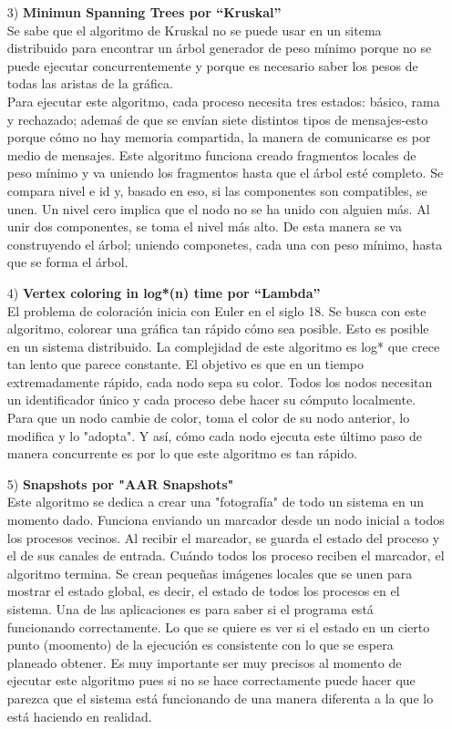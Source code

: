 \documentclass[12pt,a4paper]{report}
\begin{document}
\begin{itemize}
{    disponible. Así, dependiendo de los requerimientos del sistema, se modela un
    algoritmo que favoreca a la propiedad que sea más importante para el
    sistema.
}
\item[3)]{\textbf{Minimun Spanning Trees por “Kruskal”}\\
    Se sabe que el algoritmo de Kruskal no se puede usar en un sitema
    distribuido para encontrar un árbol generador de peso mínimo porque no se
    puede ejecutar concurrentemente y porque es necesario saber los pesos de
    todas las aristas de la gráfica. \\
    Para ejecutar este algoritmo, cada proceso necesita tres estados: básico,
    rama y rechazado; ademaś de que se envían siete distintos tipos de
    mensajes-esto porque cómo no hay memoria compartida, la manera de
    comunicarse es por medio de mensajes. Este algoritmo funciona creado
    fragmentos locales de peso mínimo y va uniendo los fragmentos hasta que el
    árbol esté completo. Se compara nivel e id y, basado en eso, si las
    componentes son compatibles, se unen. Un nivel cero implica que el nodo no
    se ha unido con alguien más. Al unir dos componentes, se toma el nivel más
    alto. De esta manera se va construyendo el árbol; uniendo componetes, cada
    una con peso mínimo, hasta que se forma el árbol.
}
\item[4)]{\textbf{Vertex coloring in log*(n) time por “Lambda”}\\
    El problema de coloración inicia con Euler en el siglo 18. Se busca con
    este algoritmo, colorear una gráfica tan rápido cómo sea posible. Esto es
    posible en un sistema distribuido. La complejidad de este algoritmo es log*
    que crece tan lento que parece constante. El objetivo es que en un tiempo
    extremadamente rápido, cada nodo sepa su color. Todos los nodos necesitan
    un identificador único y cada proceso debe hacer su cómputo localmente.
    Para que un nodo cambie de color, toma el color de su nodo anterior, lo
    modifica y lo "adopta". Y así, cómo cada nodo ejecuta este último paso de
    manera concurrente es por lo que este algoritmo es tan rápido.
}
\item[5)]{\textbf{Snapshots por "AAR Snapshots"}\\
    Este algoritmo se dedica a crear una "fotografía" de todo un sistema en un
    momento dado. Funciona enviando un marcador desde un nodo inicial a todos
    los procesos vecinos. Al recibir el marcador, se guarda el estado del
    proceso y el de sus canales de entrada. Cuándo todos los proceso reciben el
    marcador, el algoritmo termina. Se crean pequeñas imágenes locales que se
    unen para mostrar el estado global, es decir, el estado de todos los
    procesos en el sistema. Una de las aplicaciones es para saber si el
    programa está funcionando correctamente. Lo que se quiere es ver si el
    estado en un cierto punto (moomento) de la ejecución es consistente con lo
    que se espera planeado obtener. Es muy importante ser muy precisos al
    momento de ejecutar este algoritmo pues si no se hace correctamente puede
    hacer que parezca que el sistema está funcionando de una manera diferenta a
    la que lo está haciendo en realidad.
}
\end{itemize}
\end{document}
